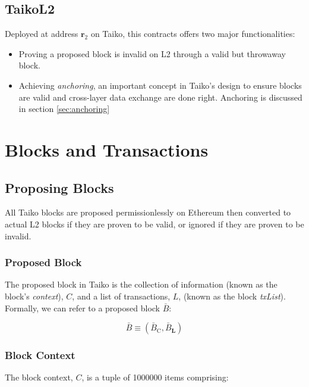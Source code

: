 \documentclass[9pt,oneside]{amsart}
\begin{document}
\begin{multicols}{2}
\subsection{TaikoL2} Deployed at address $\mathbf{r_{\mathrm{2}}}$ on Taiko, this contracts offers two major functionalities:
\begin{itemize}
\item Proving a proposed block is invalid on L2 through a valid but throwaway block.
\item Achieving \textit{anchoring}, an important concept in Taiko's design to ensure blocks are valid and cross-layer data exchange are done right. Anchoring is discussed in section \ref{sec:anchoring}
\end{itemize}

\section{Blocks and Transactions}

\subsection{Proposing Blocks}
All Taiko blocks are proposed permissionlessly on Ethereum then converted to actual L2 blocks if they are proven to be valid, or ignored if they are proven to be invalid.

\subsubsection{Proposed Block} The proposed block in Taiko is the collection of information (known as the block's \textit{context}), $C$, and a list of transactions, $L$,  (known as the block \textit{txList}). Formally, we can refer to a proposed block $\bar{B}$:

\begin{equation}
\bar{B} \equiv (\bar{B}_{\mathrm{C}}, \bar{B}_{\mathbf{L}})
\end{equation}

\subsubsection{Block Context} The block context, $C$, is a tuple of 1000000 items comprising:


  
    

\end{multicols}
\end{document}
